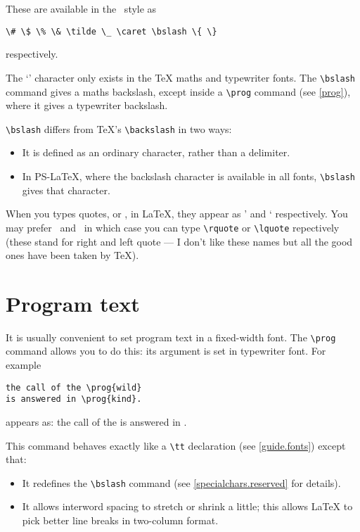 These are available in the \iso\ style as
\begin{verbatim}
\# \$ \% \& \tilde \_ \caret \bslash \{ \}
\end{verbatim}
respectively.

The `\bslash' character only exists in the TeX maths and typewriter fonts.
The \verb|\bslash| command gives a maths backslash, except inside a
\verb|\prog| command (see \ref{prog}), where it gives a typewriter
backslash.
\begin{note}
\verb|\bslash| differs from TeX's \verb|\backslash| in two ways:
\begin{itemize}
\item It is defined as an ordinary character, rather than a delimiter.
\item In PS-LaTeX, where the backslash character is available in all fonts,
    \verb|\bslash| gives that character.
\end{itemize}
\end{note}

When you types quotes, \prog{\rquote} or \prog{\lquote}, in LaTeX, they
appear as ' and ` respectively.
You may prefer \rquote\ and \lquote\ in which case you can type
\verb|\rquote| or \verb|\lquote| repectively (these stand for right and
left quote --- I don't like these names but all the good ones have been
taken by TeX).

\section{Program text}
\label{prog}
It is usually convenient to set program text in a fixed-width font.
The \verb|\prog| command allows you to do this: its argument is set in
typewriter font.
For example
\begin{verbatim}
the call of the \prog{wild}
is answered in \prog{kind}.
\end{verbatim}
appears as: 
the call of the 
is answered in .

This command behaves exactly like a \verb|\tt| declaration (see
\ref{guide.fonts}) except that:
\begin{itemize}
\item It redefines the \verb|\bslash|
command (see \ref{specialchars.reserved} for details).
\item It allows interword spacing to stretch or shrink a little;
this allows LaTeX to pick better line breaks in two-column format.
\end{itemize}

